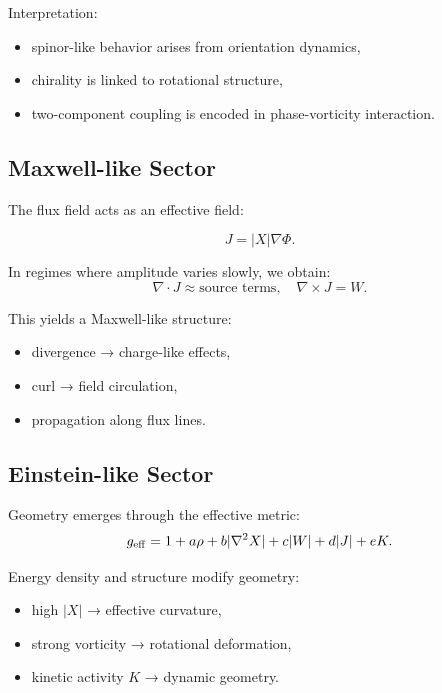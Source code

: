 \documentclass[11pt]{article}
\begin{document}
Interpretation:
\begin{itemize}
\item spinor-like behavior arises from orientation dynamics,
\item chirality is linked to rotational structure,
\item two-component coupling is encoded in phase-vorticity interaction.
\end{itemize}

\subsection{Maxwell-like Sector}

The flux field acts as an effective field:

\begin{equation}
J = |X| \nabla \Phi.
\end{equation}

In regimes where amplitude varies slowly, we obtain:
\begin{equation}
\nabla \cdot J \approx \text{source terms},
\quad
\nabla \times J = W.
\end{equation}

This yields a Maxwell-like structure:
\begin{itemize}
\item divergence → charge-like effects,
\item curl → field circulation,
\item propagation along flux lines.
\end{itemize}

\subsection{Einstein-like Sector}

Geometry emerges through the effective metric:
\begin{equation}
g_{\rm eff} = 1 + a\rho + b|\nabla^2 X| + c|W| + d|J| + eK.
\end{equation}

Energy density and structure modify geometry:
\begin{itemize}
\item high $|X|$ → effective curvature,
\item strong vorticity → rotational deformation,
\item kinetic activity $K$ → dynamic geometry.
\end{itemize}
\end{document}
